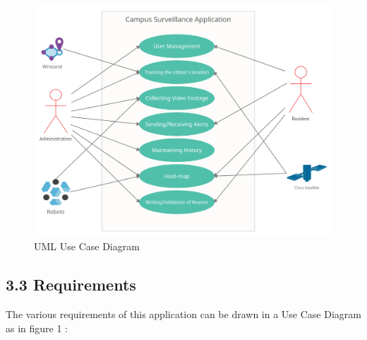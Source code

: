 \documentclass[eng]{FCEFyN-class}
\begin{document}
\begin{figure}[!htb]
 \includegraphics[scale=0.12]{filesFCEFyN-class/usecase.png} 
 \caption{UML Use Case Diagram} \label{fig-2}
 \FloatBarrier
\end{figure}

\subsection{3.3 Requirements}
The various requirements of this application can be drawn in a Use Case Diagram as in figure 1 :
\end{document}
